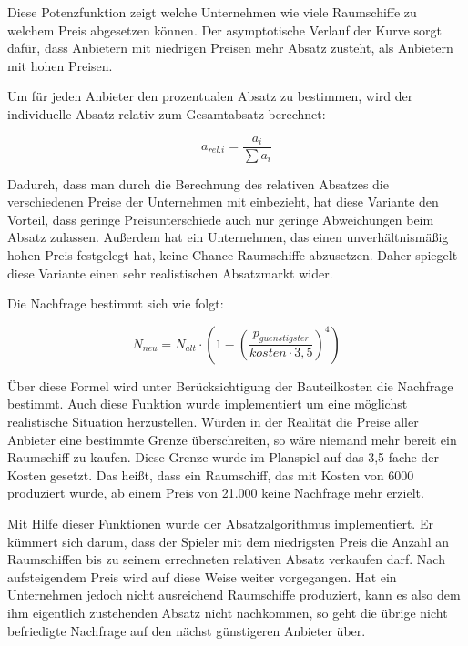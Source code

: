 Diese Potenzfunktion zeigt welche Unternehmen wie viele Raumschiffe zu welchem Preis abgesetzen können. Der asymptotische
Verlauf der Kurve sorgt dafür, dass Anbietern mit niedrigen Preisen mehr Absatz zusteht, als Anbietern mit hohen Preisen.

Um für jeden Anbieter den prozentualen Absatz zu bestimmen, wird der individuelle Absatz relativ zum Gesamtabsatz berechnet:

\begin{equation}
     a_{rel. i} = \frac{a_i}{\sum a_i}
     \label{alg:spielwelt-logik-absatzmengen-2}
\end{equation}

Dadurch, dass man durch die Berechnung des relativen Absatzes die verschiedenen Preise der Unternehmen mit einbezieht, hat
diese Variante den Vorteil, dass geringe Preisunterschiede auch nur geringe Abweichungen beim Absatz zulassen. Außerdem hat
ein Unternehmen, das einen unverhältnismäßig hohen Preis festgelegt hat, keine Chance Raumschiffe abzusetzen. Daher spiegelt
diese Variante einen sehr realistischen Absatzmarkt wider.

Die Nachfrage bestimmt sich wie folgt:

\begin{equation}
     N_{neu} = N_{alt} \cdot (1 - (\frac{p_{guenstigster}}{kosten \cdot 3,5})^4)
     \label{alg:spielwelt-logik-absatzmengen-3}
\end{equation}

Über diese Formel wird unter Berücksichtigung der Bauteilkosten die Nachfrage bestimmt. Auch diese Funktion wurde implementiert
um eine möglichst realistische Situation herzustellen. Würden in der Realität die Preise aller Anbieter eine bestimmte Grenze
überschreiten, so wäre niemand mehr bereit ein Raumschiff zu kaufen. Diese Grenze wurde im Planspiel auf das 3,5-fache der Kosten
gesetzt. Das heißt, dass ein Raumschiff, das mit Kosten von 6000\curr{} produziert wurde, ab einem Preis von 21.000\curr{} keine
Nachfrage mehr erzielt.

Mit Hilfe dieser Funktionen wurde der Absatzalgorithmus implementiert. Er kümmert sich darum, dass der Spieler mit dem niedrigsten
Preis die Anzahl an Raumschiffen bis zu seinem errechneten relativen Absatz verkaufen darf. Nach aufsteigendem Preis wird auf
diese Weise weiter vorgegangen. Hat ein Unternehmen jedoch nicht ausreichend Raumschiffe produziert, kann es also dem ihm eigentlich
zustehenden Absatz nicht nachkommen, so geht die übrige nicht befriedigte Nachfrage auf den nächst günstigeren Anbieter über.

